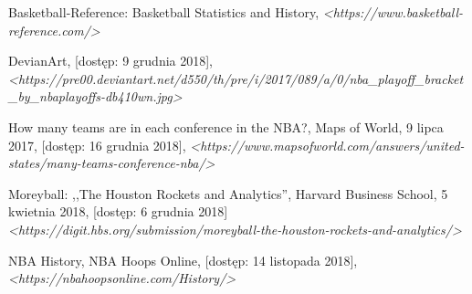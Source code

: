 \documentclass[inzynierska]{pwr_wmat_praca_dyplomowa}
\theoremstyle{plain}
\numberwithin{theorem}{chapter}
\theoremstyle{definition}
\numberwithin{theorem}{chapter}
\begin{document}
\begin{thebibliography}{9}
	Basketball-Reference: Basketball Statistics and History, \textit{<https://www.basketball-reference.com/>}
		
	DevianArt, [dostęp: 9 grudnia 2018],\\ \textit{<https://pre00.deviantart.net/d550/th/pre/i/2017/089/a/0/nba\_playoff\_bracket\_by\_nbaplayoffs-db410wn.jpg>}
	
	How many teams are in each conference in the NBA?, Maps of World, 9 lipca 2017, [dostęp: 16 grudnia 2018], \textit{<https://www.mapsofworld.com/answers/united-states/many-teams-conference-nba/>}
	
	Moreyball: ,,The Houston Rockets and Analytics'', Harvard Business School, 5 kwietnia 2018, [dostęp: 6 grudnia 2018] \textit{<https://digit.hbs.org/submission/moreyball-the-houston-rockets-and-analytics/>}
	
	NBA History, NBA Hoops Online, [dostęp: 14 listopada 2018], \textit{<https://nbahoopsonline.com/History/>}

\end{thebibliography}
\end{document}
